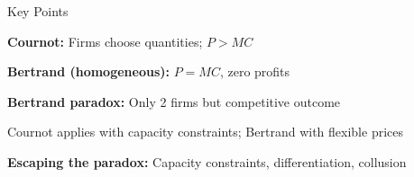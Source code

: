 \documentclass[notes,11pt, aspectratio=169]{beamer}
\newenvironment{wideenumerate}{\enumerate\addtolength{\itemsep}{10pt}}{\endenumerate}
\begin{document}
\begin{frame}{Key Points}
	\vspace{11pt}
	\begin{wideenumerate}
		\item \textbf{Cournot:} Firms choose quantities; $P > MC$
		\item \textbf{Bertrand (homogeneous):} $P = MC$, zero profits
		\item \textbf{Bertrand paradox:} Only 2 firms but competitive outcome
		\item Cournot applies with capacity constraints; Bertrand with flexible prices
		\item \textbf{Escaping the paradox:} Capacity constraints, differentiation, collusion
	\end{wideenumerate}
\end{frame}
\end{document}
